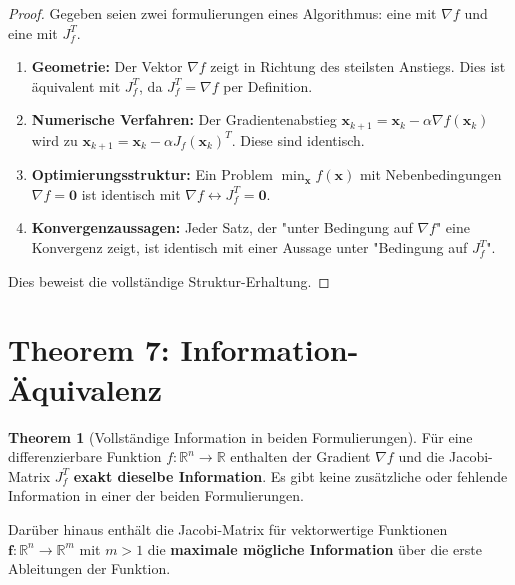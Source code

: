 ﻿\documentclass[a4paper,12pt]{article}
\theoremstyle{definition}
\newtheorem{theorem}{Theorem}
\begin{document}
\begin{proof}
	Gegeben seien zwei formulierungen eines Algorithmus: eine mit $\nabla f$ und eine mit $J_f^T$.
	
	\begin{enumerate}
		\item \textbf{Geometrie:} Der Vektor $\nabla f$ zeigt in Richtung des steilsten Anstiegs. Dies ist äquivalent mit $J_f^T$, da $J_f^T = \nabla f$ per Definition.
		
		\item \textbf{Numerische Verfahren:} Der Gradientenabstieg $\boldsymbol{x}_{k+1} = \boldsymbol{x}_k - \alpha \nabla f(\boldsymbol{x}_k)$ wird zu $\boldsymbol{x}_{k+1} = \boldsymbol{x}_k - \alpha J_f(\boldsymbol{x}_k)^T$. Diese sind identisch.
		
		\item \textbf{Optimierungsstruktur:} Ein Problem $\min_{\boldsymbol{x}} f(\boldsymbol{x})$ mit Nebenbedingungen $\nabla f = \boldsymbol{0}$ ist identisch mit $\nabla f \leftrightarrow J_f^T = \boldsymbol{0}$.
		
		\item \textbf{Konvergenzaussagen:} Jeder Satz, der "unter Bedingung auf $\nabla f$" eine Konvergenz zeigt, ist identisch mit einer Aussage unter "Bedingung auf $J_f^T$".
	\end{enumerate}
	
	Dies beweist die vollständige Struktur-Erhaltung.
\end{proof}

\section{Theorem 7: Information-Äquivalenz}

\begin{theorem}[Vollständige Information in beiden Formulierungen]
	\label{thm:information}
	Für eine differenzierbare Funktion $f: \mathbb{R}^n \to \mathbb{R}$ enthalten der Gradient $\nabla f$ und die Jacobi-Matrix $J_f^T$ \textbf{exakt dieselbe Information}. Es gibt keine zusätzliche oder fehlende Information in einer der beiden Formulierungen.
	
	Darüber hinaus enthält die Jacobi-Matrix für vektorwertige Funktionen $\boldsymbol{f}: \mathbb{R}^n \to \mathbb{R}^m$ mit $m > 1$ die \textbf{maximale mögliche Information} über die erste Ableitungen der Funktion.
\end{theorem}
\end{document}
